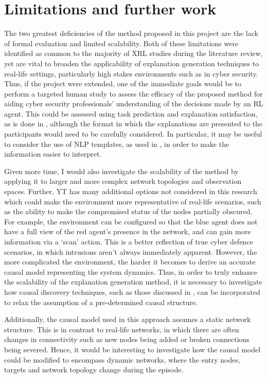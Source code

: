 \documentclass{article}
\begin{document}

\section{Limitations and further work}

The two greatest deficiencies of the method proposed in this project are the lack of formal evaluation and limited scalability. Both of these limitations were identified as common to the majority of XRL studies during the literature review, yet are vital to broaden the applicability of explanation generation techniques to real-life settings, particularly high stakes environments such as in cyber security. Thus, if the project were extended, one of the immediate goals would be to perform a targeted human study to assess the efficacy of the proposed method for aiding cyber security professionals' understanding of the decisions made by an RL agent. This could be assessed using task prediction and explanation satisfaction, as is done in \cite{madumal2020explainable}, although the format in which the explanations are presented to the participants would need to be carefully considered. In particular, it may be useful to consider the use of NLP templates, as used in \cite{madumal2020distal}, in order to make the information easier to interpret. 

Given more time, I would also investigate the scalability of the method by applying it to larger and more complex network topologies and observation spaces. Further, YT has many additional options not considered in this research which could make the environment more representative of real-life scenarios, such as the ability to make the compromised status of the nodes partially obscured. For example, the environment can be configured so that the blue agent does not have a full view of the red agent's presence in the network, and can gain more information via a `scan' action. This is a better reflection of true cyber defence scenarios, in which intrusions aren't always immediately apparent. However, the more complicated the environment, the harder it becomes to derive an accurate causal model representing the system dynamics. Thus, in order to truly enhance the scalability of the explanation generation method, it is necessary to investigate how causal discovery techniques, such as those discussed in \cite{glymour2019review}, can be incorporated to relax the assumption of a pre-determined causal structure. 

Additionally, the causal model used in this approach assumes a static network structure. This is in contrast to real-life networks, in which there are often changes in connectivity such as new nodes being added or broken connections being severed. Hence, it would be interesting to investigate how the causal model could be modified to encompass dynamic networks, where the entry nodes, targets and network topology change during the episode.
\end{document}

